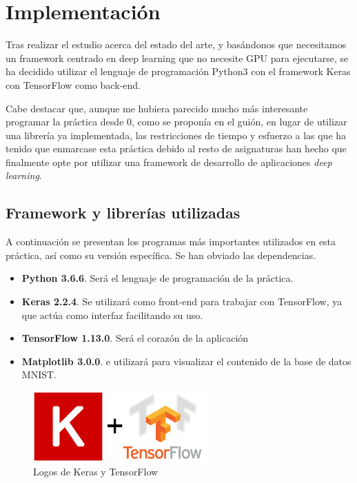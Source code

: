 \chapter{Implementación}
\label{chap:impl}

Tras realizar el estudio acerca del estado del arte, y basándonos que necesitamos un framework centrado en deep learning que no necesite GPU para ejecutarse, se ha decidido utilizar el lenguaje de programación Python3 con el framework Keras con TensorFlow como back-end.

\bigskip

Cabe destacar que, aunque me hubiera parecido mucho más interesante programar la práctica desde 0, como se proponía en el guión, en lugar de utilizar una librería ya implementada, las restricciones de tiempo y esfuerzo a las que ha tenido que enmarcase esta práctica debido al resto de asignaturas han hecho que finalmente opte por utilizar una framework de desarrollo de aplicaciones \textit{deep learning}.

\section{Framework y librerías utilizadas}

A continuación se presentan los programas más importantes utilizados en esta práctica, así como su versión específica. Se han obviado las dependencias.

\begin{itemize}
  \item \textbf{Python 3.6.6}. Será el lenguaje de programación de la práctica.
  \item \textbf{Keras 2.2.4}. Se utilizará como front-end para trabajar con TensorFlow, ya que actúa como interfaz facilitando su uso.
  \item \textbf{TensorFlow 1.13.0}. Será el corazón de la aplicación
  \item \textbf{Matplotlib 3.0.0}. e utilizará para visualizar el contenido de la base de datos MNIST.
 \end{itemize}

 \bigskip

 \begin{figure}[H]
 \centering
 \includegraphics[width=0.6\textwidth]{../images/keras-ts}
 \caption{Logos de Keras y TensorFlow}
 \label{fig:logos-keras-ts}
 \end{figure}

